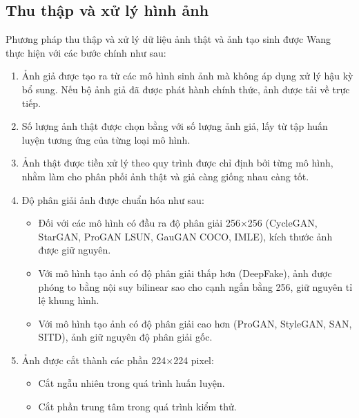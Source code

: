 \subsection{Thu thập và xử lý hình ảnh}
\label{ssec:thu_thap_va_xu_ly_hinh_anh}
%
Phương pháp thu thập và xử lý dữ liệu ảnh thật và ảnh tạo sinh được Wang~\cite{Wang2019CNNGeneratedIA} thực hiện với các bước chính như sau:
%
%
\begin{enumerate}
	\item Ảnh giả được tạo ra từ các mô hình sinh ảnh mà không áp dụng xử lý hậu kỳ bổ sung. Nếu bộ ảnh giả đã được phát hành chính thức, ảnh được tải về trực tiếp.
	
	\item Số lượng ảnh thật được chọn bằng với số lượng ảnh giả, lấy từ tập huấn luyện tương ứng của từng loại mô hình.
	
	\item Ảnh thật được tiền xử lý theo quy trình được chỉ định bởi từng mô hình, nhằm làm cho phân phối ảnh thật và giả càng giống nhau càng tốt.
	
	\item Độ phân giải ảnh được chuẩn hóa như sau:
	\begin{itemize}
		\item Đối với các mô hình có đầu ra độ phân giải 256×256 (CycleGAN, StarGAN, ProGAN LSUN, GauGAN COCO, IMLE), kích thước ảnh được giữ nguyên.
		\item Với mô hình tạo ảnh có độ phân giải thấp hơn (DeepFake), ảnh được phóng to bằng nội suy \gls{bilinear} sao cho cạnh ngắn bằng 256, giữ nguyên tỉ lệ khung hình.
		\item Với mô hình tạo ảnh có độ phân giải cao hơn (ProGAN, StyleGAN, SAN, SITD), ảnh giữ nguyên độ phân giải gốc.
	\end{itemize}
	
	\item Ảnh được cắt thành các phần 224×224 pixel:
	\begin{itemize}
		\item Cắt ngẫu nhiên trong quá trình huấn luyện.
		\item Cắt phần trung tâm trong quá trình kiểm thử.
	\end{itemize}
	
\end{enumerate}
%
%

